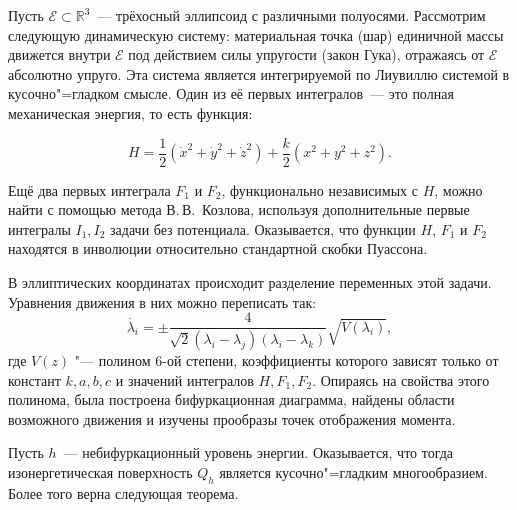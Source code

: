 

\vzmscaption



	Пусть $\mathcal{E}\subset \mathbb{R}^3$~--- трёхосный эллипсоид с различными полуосями. Рассмотрим следующую динамическую систему: материальная точка (шар) единичной массы движется внутри $\mathcal{E}$ под действием силы упругости (закон Гука), отражаясь от $\mathcal{E}$ абсолютно упруго.  Эта система является интегрируемой по Лиувиллю системой в кусочно"=гладком смысле. Один из её первых интегралов~--- это  полная механическая энер\-гия, то есть функция:

	\[
	H=\dfrac{1}{2}(\dot{x}^2+\dot{y}^2+\dot{z}^2)+\dfrac{k}{2}(x^2+y^2+z^2).
	\]

	Ещё два первых интеграла $F_1$ и $F_2$, функционально независимых с $H$, можно найти с помощью метода В.\,В.~Козлова, используя дополнительные первые ин\-те\-гра\-лы $I_1, I_2$ задачи без потенциала. Оказывается, что функции $H$, $F_1$ и $F_2$ находятся в инволюции относительно стандартной скобки Пуассона.

	В эллиптических координатах происходит разделение переменных этой задачи. Уравнения движения в них можно переписать так:
	\[
	\dot{\lambda_i}=\pm\dfrac{4}{\sqrt{2}(\lambda_i-\lambda_j)(\lambda_i-\lambda_k)}\sqrt{V(\lambda_i)},
	\]
	где $V(z)$ "--- полином 6-ой степени, коэффициенты которого зависят только от констант $k,a,b,c$ и значений интегралов $H,F_1,F_2$. Опираясь на свойства этого полинома, была построена бифуркационная диаграмма, найдены области возможного движения и изучены прообразы точек отображения момента.

	Пусть $h$~--- небифуркационный уровень энергии. Оказывается, что тогда изонергетическая поверхность $Q_h$ является кусочно"=гладким многообразием. Более того верна следующая теорема.

